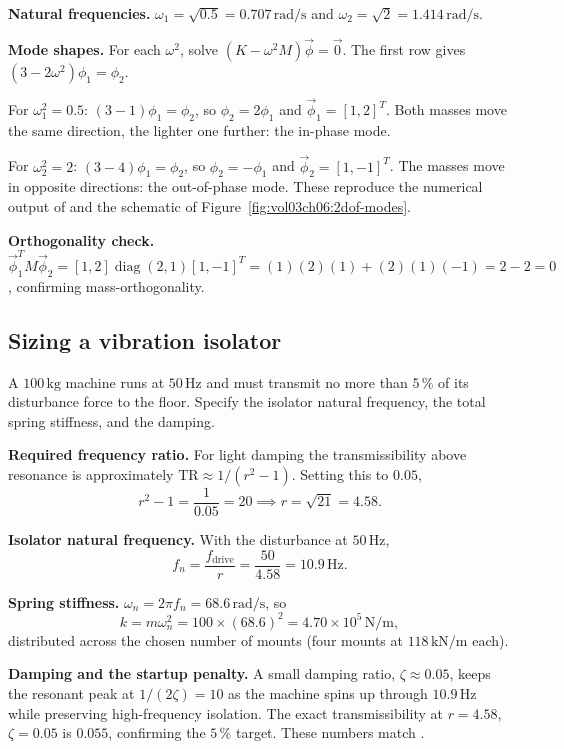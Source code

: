 \textbf{Natural frequencies.} $\omega_1 = \sqrt{0.5} = 0.707\,\si{
\radian\per\second}$ and $\omega_2 = \sqrt{2} = 1.414\,\si{\radian\per
\second}$.

\textbf{Mode shapes.} For each $\omega^2$, solve $(K - \omega^2 M)
\vec{\phi} = \vec{0}$. The first row gives $(3 - 2\omega^2)\phi_1 =
\phi_2$.

For $\omega_1^2 = 0.5$: $(3 - 1)\phi_1 = \phi_2$, so $\phi_2 =
2\phi_1$ and $\vec{\phi}_1 = [1, 2]^T$. Both masses move the same
direction, the lighter one further: the in-phase mode.

For $\omega_2^2 = 2$: $(3 - 4)\phi_1 = \phi_2$, so $\phi_2 = -\phi_1$
and $\vec{\phi}_2 = [1, -1]^T$. The masses move in opposite
directions: the out-of-phase mode. These reproduce the numerical
output of  and the schematic of
Figure~\ref{fig:vol03ch06:2dof-modes}.

\textbf{Orthogonality check.} $\vec{\phi}_1^T M \vec{\phi}_2 = [1, 2]
\operatorname{diag}(2,1) [1, -1]^T = (1)(2)(1) + (2)(1)(-1) = 2 - 2 =
0$, confirming mass-orthogonality.

\subsection{Sizing a vibration isolator}

A $100\,\si{\kilogram}$ machine runs at $50\,\si{\hertz}$ and must
transmit no more than $5\,\%$ of its disturbance force to the floor.
Specify the isolator natural frequency, the total spring stiffness,
and the damping.

\textbf{Required frequency ratio.} For light damping the
transmissibility above resonance is approximately $\mathrm{TR}
\approx 1/(r^2 - 1)$. Setting this to $0.05$,
\[
r^2 - 1 = \frac{1}{0.05} = 20 \implies r = \sqrt{21} = 4.58.
\]

\textbf{Isolator natural frequency.} With the disturbance at $50\,
\si{\hertz}$,
\[
f_n = \frac{f_{\text{drive}}}{r} = \frac{50}{4.58} = 10.9\,\si{\hertz}.
\]

\textbf{Spring stiffness.} $\omega_n = 2\pi f_n = 68.6\,\si{\radian
\per\second}$, so
\[
k = m\omega_n^2 = 100 \times (68.6)^2 = 4.70 \times 10^5\,\si{\newton
\per\meter},
\]
distributed across the chosen number of mounts (four mounts at $118\,
\si{\kilo\newton\per\meter}$ each).

\textbf{Damping and the startup penalty.} A small damping ratio,
$\zeta \approx 0.05$, keeps the resonant peak at $1/(2\zeta) = 10$ as
the machine spins up through $10.9\,\si{\hertz}$ while preserving
high-frequency isolation. The exact transmissibility at $r = 4.58$,
$\zeta = 0.05$ is $0.055$, confirming the $5\,\%$ target. These
numbers match .

